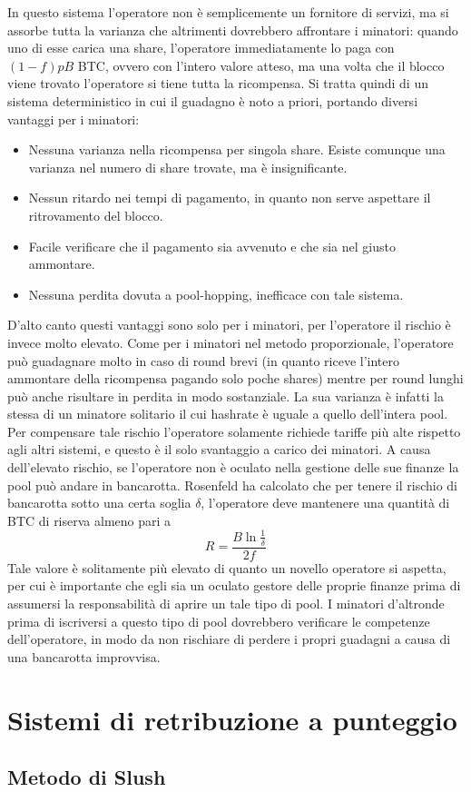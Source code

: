In questo sistema l'operatore non è semplicemente un fornitore di servizi, ma si assorbe tutta la varianza che altrimenti dovrebbero affrontare i minatori: quando uno di esse carica una share, l'operatore immediatamente lo paga con $(1-f)pB$ BTC, ovvero con l'intero valore atteso, ma una volta che il blocco viene trovato l'operatore si tiene tutta la ricompensa.
Si tratta quindi di un sistema deterministico in cui il guadagno è noto a priori, portando diversi vantaggi per i minatori:
\begin{itemize}
    \item Nessuna varianza nella ricompensa per singola share. Esiste comunque una varianza nel numero di share trovate, ma è insignificante.
    \item Nessun ritardo nei tempi di pagamento, in quanto non serve aspettare il ritrovamento del blocco.
    \item Facile verificare che il pagamento sia avvenuto e che sia nel giusto ammontare.
    \item Nessuna perdita dovuta a pool-hopping, inefficace con tale sistema.
\end{itemize}
D'alto canto questi vantaggi sono solo per i minatori, per l'operatore il rischio è invece molto elevato. Come per i minatori nel metodo proporzionale, l'operatore può guadagnare molto in caso di round brevi (in quanto riceve l'intero ammontare della ricompensa pagando solo poche shares) mentre per round lunghi può anche risultare in perdita in modo sostanziale. La sua varianza è infatti la stessa di un minatore solitario il cui hashrate è uguale a quello dell'intera pool. Per compensare tale rischio l'operatore solamente richiede tariffe più alte rispetto agli altri sistemi, e questo è il solo svantaggio a carico dei minatori.
A causa dell'elevato rischio, se l'operatore non è oculato nella gestione delle sue finanze la pool può andare in bancarotta. Rosenfeld ha calcolato che per tenere il rischio di bancarotta sotto una certa soglia $\delta$, l'operatore deve mantenere una quantità di BTC di riserva almeno pari a
\[R = \frac{B \ln\frac{1}{\delta} }{2f}\]
Tale valore è solitamente più elevato di quanto un novello operatore si aspetta, per cui è importante che egli sia un oculato gestore delle proprie finanze prima di assumersi la responsabilità di aprire un tale tipo di pool. I minatori d'altronde prima di iscriversi a questo tipo di pool dovrebbero verificare le competenze dell'operatore, in modo da non rischiare di perdere i propri guadagni a causa di una bancarotta improvvisa.

\section{Sistemi di retribuzione a punteggio}

\subsection{Metodo di Slush}



